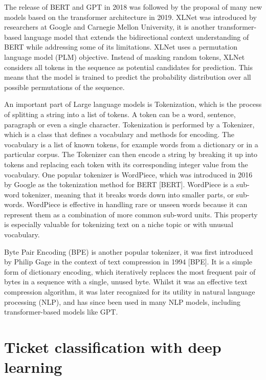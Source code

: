 \documentclass{UoYCSproject}
\begin{document}
The release of BERT and GPT in 2018 was followed by the proposal of many new models based on the transformer architecture in 2019.
XLNet was introduced by researchers at Google and Carnegie Mellon University, it is another transformer-based language model that extends the bidirectional context understanding of BERT while addressing some of its limitations.
XLNet uses a permutation language model (PLM) objective.
Instead of masking random tokens, XLNet considers all tokens in the sequence as potential candidates for prediction.
This means that the model is trained to predict the probability distribution over all possible permutations of the sequence.


An important part of Large language models is Tokenization, which is the process of splitting a string into a list of
tokens.
A token can be a word, sentence, paragraph or even a single character.
Tokenization is performed by a Tokenizer, which is a class that defines a vocabulary and methods for encoding.
The vocabulary is a list of known tokens, for example words from a dictionary or in a particular corpus.
The Tokenizer can then encode a string by breaking it up into tokens and replacing each token with its corresponding integer value from the vocabulary.
One popular tokenizer is WordPiece, which was introduced in 2016 by Google as the tokenization method for BERT [BERT].
WordPiece is a sub-word tokenizer, meaning that it breaks words down into smaller parts, or sub-words.
WordPiece is effective in handling rare or unseen words because it can represent them as a combination of more common sub-word units.
This property is especially valuable for tokenizing text on a niche topic or with unusual vocabulary. \par

Byte Pair Encoding (BPE) is another popular tokenizer, it was first introduced by Philip Gage in the context of text compression in 1994 [BPE].
It is a simple form of dictionary encoding, which iteratively replaces the most frequent pair of bytes in a sequence with a single, unused byte.
Whilst it was an effective text compression algorithm, it was later recognized for its utility in natural language processing (NLP),
and has since been used in many NLP models, including transformer-based models like GPT.

\section{Ticket classification with deep learning}
\label{sec:estimation-with-deep-learning}
\end{document}

